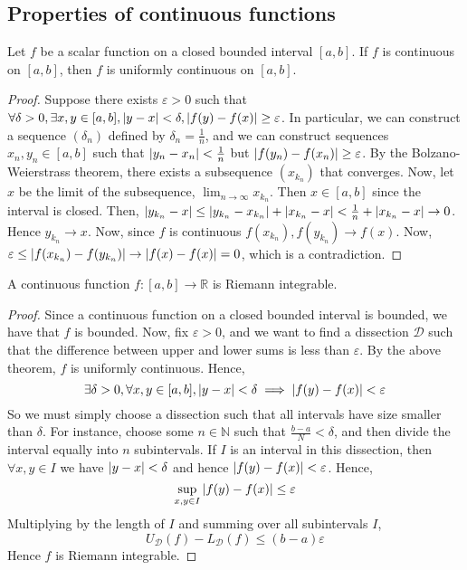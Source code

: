 \subsection{Properties of continuous functions}
\begin{theorem}
	Let \( f \) be a scalar function on a closed bounded interval \( [a,b] \).
	If \( f \) is continuous on \( [a,b] \), then \( f \) is uniformly continuous on \( [a,b] \).
\end{theorem}
\begin{proof}
	Suppose there exists \( \varepsilon > 0 \) such that \( \forall \delta > 0, \exists x,y \in [a,b], \abs{y-x} < \delta, \abs{f(y)-f(x)} \geq \varepsilon \).
	In particular, we can construct a sequence \( (\delta_n) \) defined by \( \delta_n = \frac{1}{n} \), and we can construct sequences \( x_n, y_n \in [a,b] \) such that \( \abs{y_n-x_n} < \frac{1}{n} \) but \( \abs{f(y_n) - f(x_n)} \geq \varepsilon \).
	By the Bolzano-Weierstrass theorem, there exists a subsequence \( (x_{k_n}) \) that converges.
	Now, let \( x \) be the limit of the subsequence, \( \lim_{n \to \infty} x_{k_n} \).
	Then \( x \in [a,b] \) since the interval is closed.
	Then, \( \abs{y_{k_n} - x} \leq \abs{y_{k_n} - x_{k_n}} + \abs{x_{k_n} - x} < \frac{1}{n} + \abs{x_{k_n} - x} \to 0 \).
	Hence \( y_{k_n} \to x \).
	Now, since \( f \) is continuous \( f(x_{k_n}), f(y_{k_n}) \to f(x) \).
	Now, \( \varepsilon \leq \abs{f(x_{k_n}) - f(y_{k_n})} \to \abs{f(x) - f(x)} = 0 \), which is a contradiction.
\end{proof}
\begin{corollary}
	A continuous function \( f \colon [a,b] \to \mathbb R \) is Riemann integrable.
\end{corollary}
\begin{proof}
	Since a continuous function on a closed bounded interval is bounded, we have that \( f \) is bounded.
	Now, fix \( \varepsilon > 0 \), and we want to find a dissection \( \mathcal D \) such that the difference between upper and lower sums is less than \( \varepsilon \).
	By the above theorem, \( f \) is uniformly continuous.
	Hence,
	\[
		\exists \delta > 0, \forall x, y \in [a,b], \abs{y-x} < \delta \implies \abs{f(y) - f(x)} < \varepsilon
	\]
	So we must simply choose a dissection such that all intervals have size smaller than \( \delta \).
	For instance, choose some \( n \in \mathbb N \) such that \( \frac{b-a}{N} < \delta \), and then divide the interval equally into \( n \) subintervals.
	If \( I \) is an interval in this dissection, then \( \forall x,y \in I \) we have \( \abs{y-x} < \delta \) and hence \( \abs{f(y) - f(x)} < \varepsilon \).
	Hence,
	\[
		\sup_{x,y \in I} \abs{f(y) - f(x)} \leq \varepsilon
	\]
	Multiplying by the length of \( I \) and summing over all subintervals \( I \),
	\[
		U_{\mathcal D}(f) - L_{\mathcal D}(f) \leq (b-a) \varepsilon
	\]
	Hence \( f \) is Riemann integrable.
\end{proof}
